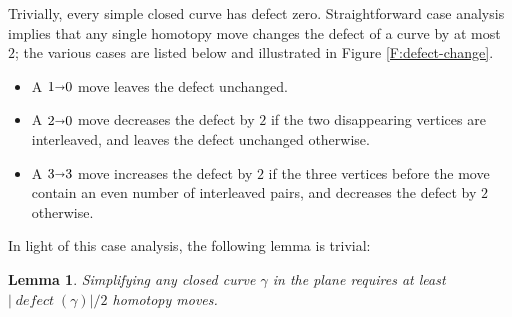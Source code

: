 \documentclass[11pt,twoside]{article}
\def\arcto{\mathord\shortrightarrow}
\def\arc#1#2{#1\arcto#2}
\def\abs#1{\mathopen| #1 \mathclose|}		%
\def\Defect{\operatorname{\mathit{defect}}}
\newtheorem{lemma}[theorem]{Lemma}
\numberwithin{figure}{section}
\begin{document}
%
%

Trivially, every simple closed curve has defect zero. Straightforward case analysis~\cite{p-icfgd-98} implies that any single homotopy move changes the defect of a curve by at most $2$; the various cases are listed below and illustrated in Figure \ref{F:defect-change}.  
\vspace{3pt}
\begin{itemize}\itemsep0pt
\item A $\arc10$ move leaves the defect unchanged.
\item A $\arc20$ move decreases the defect by $2$ if the two disappearing vertices are interleaved, and leaves the defect unchanged otherwise.
\item A $\arc33$ move increases the defect by $2$ if the three vertices before the move contain an even number of interleaved pairs, and decreases the defect by $2$ otherwise.
\end{itemize}
%
In light of this case analysis, the following lemma is trivial:
%
\begin{lemma}
\label{L:defect}
Simplifying any closed curve $\gamma$ in the plane requires at least $\abs{\Defect(\gamma)}/2$ homotopy moves.
\end{lemma}
\unskip
\end{document}
